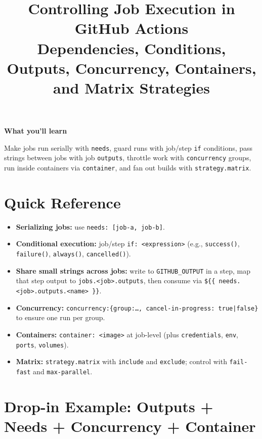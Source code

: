 \documentclass[11pt]{article}
\title{\textbf{Controlling Job Execution in GitHub Actions}\\
\large Dependencies, Conditions, Outputs, Concurrency, Containers, and Matrix Strategies}
\author{}
\date{}
\newenvironment{callout}[1]{%
  \def\FrameCommand{\fcolorbox{calloutframe}{calloutback}}%
  \MakeFramed{\advance\hsize-\width \FrameRestore}%
  \noindent\textbf{#1}\par\medskip
}{%
  \endMakeFramed
}
\begin{document}
\maketitle

\begin{callout}{What you'll learn}
Make jobs run serially with \texttt{needs}, guard runs with job/step \texttt{if} conditions, pass strings between jobs with job \texttt{outputs}, throttle work with \texttt{concurrency} groups, run inside containers via \texttt{container}, and fan out builds with \texttt{strategy.matrix}.
\end{callout}

\section*{Quick Reference}
\begin{itemize}
  \item \textbf{Serializing jobs:} use \texttt{needs: [job-a, job-b]}.
  \item \textbf{Conditional execution:} job/step \texttt{if: <expression>} (e.g., \texttt{success()}, \texttt{failure()}, \texttt{always()}, \texttt{cancelled()}).
  \item \textbf{Share small strings across jobs:} write to \texttt{GITHUB\_OUTPUT} in a step, map that step output to \texttt{jobs.<job>.outputs}, then consume via \texttt{\$\{\{ needs.<job>.outputs.<name> \}\}}.
  \item \textbf{Concurrency:} \texttt{concurrency:\{group:\ldots, cancel-in-progress: true|false\}} to ensure one run per group.
  \item \textbf{Containers:} \texttt{container: <image>} at job-level (plus \texttt{credentials}, \texttt{env}, \texttt{ports}, \texttt{volumes}).
  \item \textbf{Matrix:} \texttt{strategy.matrix} with \texttt{include} and \texttt{exclude}; control with \texttt{fail-fast} and \texttt{max-parallel}.
\end{itemize}

\section{Drop-in Example: Outputs + Needs + Concurrency + Container}
\end{document}
